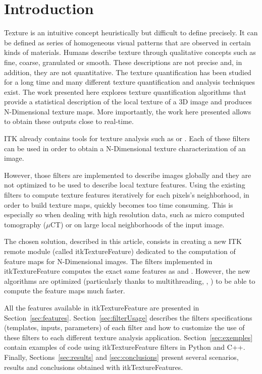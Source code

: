 \documentclass{InsightArticle}
\newcommand{\IJhandlerIDnumber}{3574}
\begin{document}
\IJhandlenote{\IJhandlerIDnumber}
\newpage
\tableofcontents
\newpage
\section{Introduction}
\label{sec:intro}

Texture is an intuitive concept heuristically but difficult to define
precisely. It can be defined as series of homogeneous visual patterns that are
observed in certain kinds of materials. Humans describe texture through
qualitative concepts such as fine, coarse, granulated or smooth. These
descriptions are not precise and, in addition, they are not quantitative. The
texture quantification has been studied for a long time and many different texture quantification and analysis techniques exist. The work presented here explores texture quantification algorithms that provide a statistical description of the local texture of a 3D image and produces N-Dimensional texture maps. More importantly, the work here presented allows to obtain these outputs close to real-time.

ITK already contains tools for texture analysis such as
 or
. Each of these filters can be
used in order to obtain a N-Dimensional texture characterization of an image.

However, those filters are implemented to describe images globally and they
are not optimized to be used to describe local texture features. Using the
existing filters to compute texture features iteratively for each pixels's
neighborhood, in order to build texture maps, quickly becomes too time
consuming. This is especially so when dealing with high resolution data, such
as micro computed tomography ($\mu$CT) or on large local neighborhoods of the input image.

The chosen solution, described in this article, consists in creating a new ITK
remote module (called itkTextureFeature) dedicated to the computation of feature maps
for N-Dimensional images. The filters implemented in itkTextureFeature
computes the exact same features as  and . However, the new algorithms are optimized (particularly thanks to multithreading, , ) to be able to compute the feature maps much faster.

All the features available in itkTextureFeature are presented in
Section~\ref{sec:features}. Section~\ref{sec:filterUsage} describes the
filters specifications (templates, inputs, parameters) of each filter and how
to customize the use of these filters to each different texture analysis
application. Section~\ref{sec:exemples} contain examples of code using
itkTextureFeature filters in Python and C++. Finally,
Sections~\ref{sec:results} and \ref{sec:conclusions} present several
scenarios, results and conclusions obtained with itkTextureFeatures.
\newpage
\end{document}
